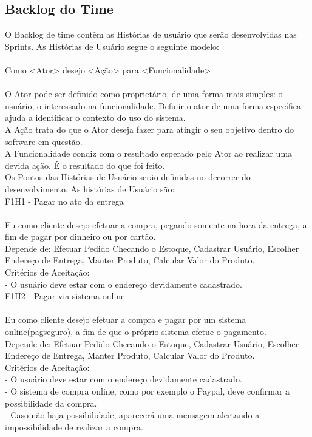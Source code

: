 \subsection{Backlog do Time}
O Backlog de time contêm as Histórias de usuário que serão desenvolvidas nas Sprints. As Histórias de Usuário segue o seguinte modelo:\\
\\
\tab Como <Ator> desejo <Ação> para <Funcionalidade>\\
\\
\tab O Ator pode ser definido como proprietário, de uma forma mais simples: o usuário, o interessado na funcionalidade. Definir o ator de uma forma específica ajuda a identificar o contexto do uso do sistema.\\
\tab A Ação trata do que o Ator deseja fazer para atingir o seu objetivo dentro do software em questão.\\
\tab A Funcionalidade condiz com o resultado esperado pelo Ator ao realizar uma devida ação. É o resultado do que foi feito.\\
\tab Os Pontos das Histórias de Usuário serão definidas no decorrer do desenvolvimento. As histórias de Usuário são:\\


F1H1 - Pagar no ato da entrega \\
\\
\tab Eu como cliente desejo efetuar a compra, pegando somente na hora da entrega, a fim de pagar por dinheiro ou por cartão.\\
\tab Depende de: Efetuar Pedido Checando o Estoque, Cadastrar Usuário, Escolher Endereço de Entrega, Manter Produto, Calcular Valor do Produto.\\
\tab Critérios de Aceitação:\\
\tab - O usuário deve estar com o endereço devidamente cadastrado. \\

F1H2 - Pagar via sistema online\\
\\
\tab Eu como cliente desejo efetuar a compra e pagar por um sistema online(pagseguro), a fim de que o próprio sistema efetue o pagamento.\\
Depende de: Efetuar Pedido Checando o Estoque, Cadastrar Usuário, Escolher Endereço de Entrega, Manter Produto, Calcular Valor do Produto.\\
\tab Critérios de Aceitação:\\
\tab - O usuário deve estar com o endereço devidamente cadastrado. \\
\tab - O sistema de compra online, como por exemplo o  Paypal, deve confirmar a possibilidade da compra.\\
\tab - Caso não haja possibilidade, aparecerá uma mensagem alertando a impossibilidade de realizar a compra.\\


